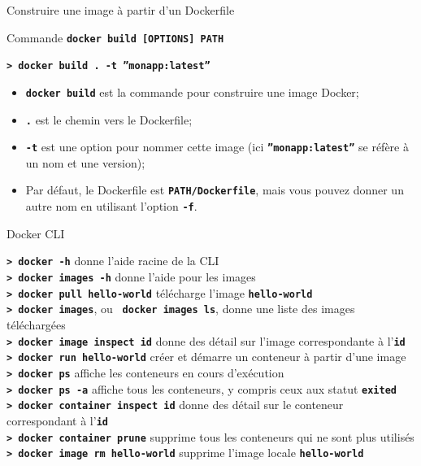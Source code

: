 \documentclass[aspectratio=169,10pt]{beamer}
\begin{document}

\begin{frame}{Construire une image à partir d'un Dockerfile}

\begin{block}{Commande}
\texttt{\textbf{docker build [OPTIONS] PATH}}
\end{block}

\texttt{\textbf{> docker build . -t ”monapp:latest”}}
\begin{itemize}
    \item \texttt{\textbf{docker build}} est la commande pour construire une image Docker;
    \item \texttt{\textbf{.}} est le chemin vers le Dockerfile;
    \item \texttt{\textbf{-t}} est une option pour nommer cette image (ici \texttt{\textbf{”monapp:latest”}} se réfère à un nom et une version);
    \item Par défaut, le Dockerfile est \texttt{\textbf{PATH/Dockerfile}}, mais vous pouvez donner un autre nom en utilisant l'option \texttt{\textbf{-f}}.
\end{itemize}

\end{frame}


\begin{frame}{Docker CLI}

\texttt{\textbf{> docker -h}} donne l'aide racine de la CLI\\
\texttt{\textbf{> docker images -h}} donne l'aide pour les images\\

\texttt{\textbf{> docker pull hello-world}} télécharge l'image \texttt{\textbf{hello-world}}\\
\texttt{\textbf{> docker images}}, ou \texttt{\textbf{ docker images ls}}, donne une liste des images téléchargées\\
\texttt{\textbf{> docker image inspect id}} donne des détail sur l'image correspondante à l'\texttt{\textbf{id}}\\

\texttt{\textbf{> docker run hello-world}} créer et démarre un conteneur à partir d'une image\\
\texttt{\textbf{> docker ps}} affiche les conteneurs en cours d'exécution\\
\texttt{\textbf{> docker ps -a}} affiche tous les conteneurs, y compris ceux aux statut \texttt{\textbf{exited}}\\
\texttt{\textbf{> docker container inspect id}} donne des détail sur le conteneur correspondant à l'\texttt{\textbf{id}}\\

\texttt{\textbf{> docker container prune}} supprime tous les conteneurs qui ne sont plus utilisés\\
\texttt{\textbf{> docker image rm hello-world}} supprime l'image locale \texttt{\textbf{hello-world}}
\end{frame}
\end{document}
